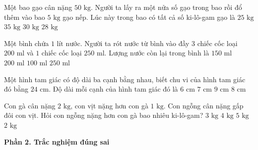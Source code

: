 \begin{ex} %
Một bao gạo cân nặng $50\text{ kg}$. Người ta lấy ra một nửa số gạo trong bao rồi đổ thêm vào bao $5\text{ kg}$ gạo nếp. Lúc này trong bao có tất cả số ki-lô-gam gạo là
\choice
{$25\text{ kg}$}
{$35\text{ kg}$}
{\True $30\text{ kg}$}
{$28\text{ kg}$}
\end{ex}

\begin{ex} %
Một bình chứa $1\text{ lít}$ nước. Người ta rót nước từ bình vào đầy $3$ chiếc cốc loại $200\text{ ml}$ và $1$ chiếc cốc loại $250\text{ ml}$. Lượng nước còn lại trong bình là
\choice
{\True $150\text{ ml}$}
{$200\text{ ml}$}
{$100\text{ ml}$}
{$250\text{ ml}$}
\end{ex}

\begin{ex} %
Một hình tam giác có độ dài ba cạnh bằng nhau, biết chu vi của hình tam giác đó bằng $24\text{ cm}$. Độ dài mỗi cạnh của hình tam giác đó là
\choice
{$6\text{ cm}$}
{$7\text{ cm}$}
{$9\text{ cm}$}
{\True $8\text{ cm}$}
\end{ex}

\begin{ex} %
Con gà cân nặng $2\text{ kg}$, con vịt nặng hơn con gà $1\text{ kg}$. Con ngỗng cân nặng gấp đôi con vịt. Hỏi con ngỗng nặng hơn con gà bao nhiêu ki-lô-gam?
\choice
{$3\text{ kg}$}
{\True $4\text{ kg}$}
{$5\text{ kg}$}
{$2\text{ kg}$}
\end{ex}

\textbf{Phần 2. Trắc nghiệm đúng sai}

